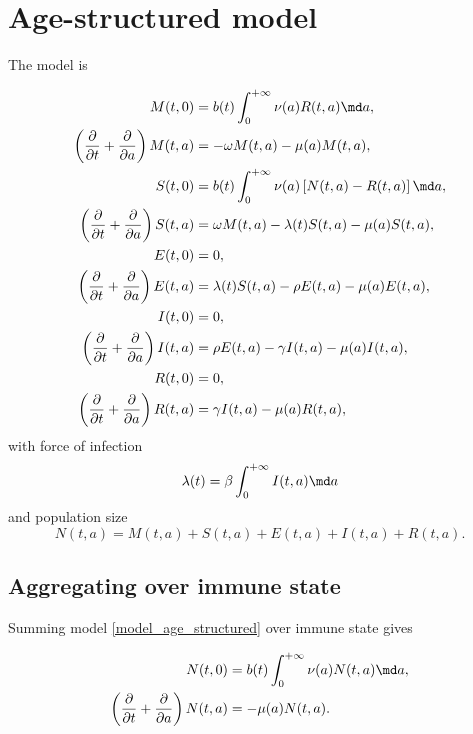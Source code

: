 \documentclass{jpmarticle}
\let\subequationsorig\subequations%
\let\endsubequationsorig\endsubequations%
\renewenvironment{subequations}{
  \subequationsorig
  \renewcommand{\theequation}{\theparentequation.\arabic{equation}}
}{
  \endsubequationsorig
}
\begin{document}
\section{Age-structured model}

The model is
\begin{subequations}
  \label{model_age_structured}
  \begin{align}
    M(t, 0)
    &= b(t) \int_0^{+\infty} \nu(a) R(t, a) \md a,
    \\
    \left(\frac{\partial}{\partial t}
      + \frac{\partial}{\partial a}\right)
    M(t, a)
    &= - \omega M(t, a) - \mu(a) M(t, a),
    \\
    S(t, 0)
    &= b(t) \int_0^{+\infty} \nu(a) \left[N(t, a) - R(t, a)\right] \md a,
    \\
    \left(\frac{\partial}{\partial t}
      + \frac{\partial}{\partial a}\right)
    S(t, a)
    &= \omega M(t, a) - \lambda(t) S(t, a) - \mu(a) S(t, a),
    \\
    E(t, 0)
    &= 0,
    \\
    \left(\frac{\partial}{\partial t}
      + \frac{\partial}{\partial a}\right)
    E(t, a)
    &= \lambda(t) S(t, a) - \rho E(t, a) - \mu(a) E(t, a),
    \\
    I(t, 0)
    &= 0,
    \\
    \left(\frac{\partial}{\partial t}
      + \frac{\partial}{\partial a}\right)
    I(t, a)
    &= \rho E(t, a) - \gamma I(t, a) - \mu(a) I(t, a),
    \\
    R(t, 0)
    &= 0,
    \\
    \left(\frac{\partial}{\partial t}
      + \frac{\partial}{\partial a}\right)
    R(t, a)
    &= \gamma I(t, a) - \mu(a) R(t, a),
  \end{align}
  with force of infection
  \begin{equation}
    \lambda(t) = \beta \int_0^{+\infty} I(t, a) \md a
  \end{equation}
  and population size
  \begin{equation}
    N(t, a) = M(t, a) + S(t, a) + E(t, a) + I(t, a) + R(t, a).
  \end{equation}
\end{subequations}


\subsection{Aggregating over immune state}

Summing model \eqref{model_age_structured} over immune state gives
\begin{subequations}
  \label{model_age_structured_agg_state}
  \begin{align}
    N(t, 0)
    &= b(t) \int_0^{+\infty} \nu(a) N(t, a) \md a,
    \\
    \left(\frac{\partial}{\partial t}
      + \frac{\partial}{\partial a}\right)
    N(t, a)
    &= - \mu(a) N(t, a).
  \end{align}
\end{subequations}
\end{document}
